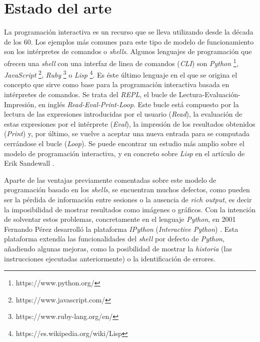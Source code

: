 \documentclass[11pt,spanish,listoffigures]{tfgetsinf}
\begin{document}


\chapter{Estado del arte}
\label{ch:state-of-art}

La programación interactiva es un recurso que se lleva utilizando desde la década de los 60. Los ejemplos más comunes para este tipo de modelo de funcionamiento son los intérpretes de comandos o \textit{shells}. Algunos lenguajes de programación que ofrecen una \textit{shell} con una interfaz de linea de comandos (\textit{CLI}) son \textit{Python} \footnote{https://www.python.org/}, \textit{JavaScript} \footnote{https://www.javascript.com/}, \textit{Ruby} \footnote{https://www.ruby-lang.org/en/} o \textit{Lisp} \footnote{https://es.wikipedia.org/wiki/Lisp}. Es éste último lenguaje en el que se origina el concepto que sirve como base para la programación interactiva basada en intérpretes de comandos. Se trata del \textit{REPL}, el bucle de Lectura-Evaluación-Impresión, en inglés \textit{Read-Eval-Print-Loop}. Este bucle está compuesto por la lectura de las expresiones introducidas por el usuario (\textit{Read}), la evaluación de estas expresiones por el intérprete (\textit{Eval}), la impresión de los resultados obtenidos (\textit{Print}) y, por último, se vuelve a aceptar una nueva entrada para se computada cerrándose el bucle (\textit{Loop}). Se puede encontrar un estudio más amplio sobre el modelo de programación interactiva, y en concreto sobre \textit{Lisp} en el artículo de Erik Sandewall \cite{Sandewall}.

Aparte de las ventajas previamente comentadas sobre este modelo de programación basado en los \textit{shells}, se encuentran muchos defectos, como pueden ser la pérdida de información entre sesiones o la ausencia de \textit{rich output}, es decir la imposibilidad de mostrar resultados como imágenes o gráficos. Con la intención de solventar estos problemas, concretamente en el lenguaje \textit{Python}, en 2001 Fernando Pérez desarrolló la plataforma \textit{IPython} (\textit{Interactive Python}) \cite{ipython}. Esta plataforma extendía las funcionalidades del \textit{shell} por defecto de \textit{Python}, añadiendo algunas mejoras, como la posibilidad de mostrar la \textit{historia} (las instrucciones ejecutadas anteriormente) o la identificación de errores.
\end{document}
